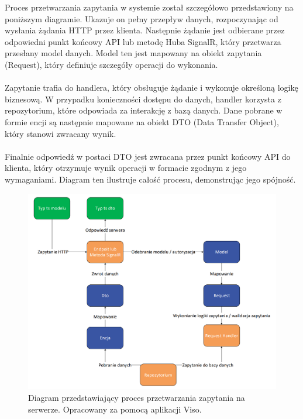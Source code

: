 \documentclass[12pt,a4paper]{article}
\begin{document}
\noindent
Proces przetwarzania zapytania w systemie został szczegółowo przedstawiony na poniższym diagramie. Ukazuje on pełny przepływ danych, rozpoczynając od wysłania żądania HTTP przez klienta. Następnie żądanie jest odbierane przez odpowiedni punkt końcowy API lub metodę Huba SignalR, który przetwarza przesłany model danych. Model ten jest mapowany na obiekt zapytania (Request), który definiuje szczegóły operacji do wykonania.
\\\\
Zapytanie trafia do handlera, który obsługuje żądanie i wykonuje określoną logikę biznesową. W przypadku konieczności dostępu do danych, handler korzysta z repozytorium, które odpowiada za interakcję z bazą danych. Dane pobrane w formie encji są następnie mapowane na obiekt DTO (Data Transfer Object), który stanowi zwracany wynik. 
\\\\
Finalnie odpowiedź w postaci DTO jest zwracana przez punkt końcowy API do klienta, który otrzymuje wynik operacji w formacie zgodnym z jego wymaganiami. Diagram ten ilustruje całość procesu, demonstrując jego spójność.

\vspace{0.5cm}
\begin{figure}[h!]
    \centering
    \includegraphics[width=1\textwidth]{images/diagram_back.png}
    \caption{Diagram przedstawiający proces przetwarzania zapytania na serwerze. Opracowany za pomocą aplikacji Viso.}
\end{figure}

\newpage
\end{document}
